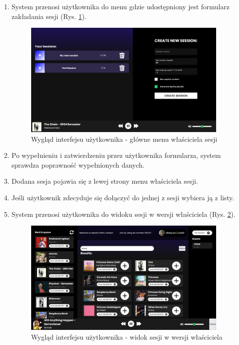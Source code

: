 \begin{enumerate}
\item System przenosi użytkownika do menu gdzie udostępniony jest formularz zakładania sesji (Rys. \ref{fig:admin-menu}).
\begin{figure}[h]
\centering
\includegraphics[width=0.95\textwidth]{./graf/admin_menu.png}
\caption{Wygląd interfejsu użytkownika - główne menu właściciela sesji}
\label{fig:admin-menu}
\end{figure}

\item Po wypełnieniu i zatwierdzeniu przez użytkownika formularza, system sprawdza poprawność wypełnionych danych.
\item Dodana sesja pojawia się z lewej strony menu właściciela sesji.
\item Jeśli użytkownik zdecyduje się dołączyć do jednej z sesji wybiera ją z listy.
\item System przenosi użytkownika do widoku sesji w wersji właściciela (Rys. \ref{fig:session-menu-owner}).
\begin{figure}[h]
\centering
\includegraphics[width=0.95\textwidth]{./graf/admin_session_menu.png}
\caption{Wygląd interfejsu użytkownika - widok sesji w wersji właściciela}
\label{fig:session-menu-owner}
\end{figure}
\end{enumerate}

